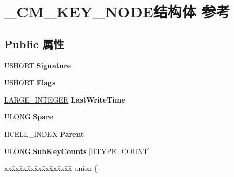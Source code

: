 \hypertarget{struct___c_m___k_e_y___n_o_d_e}{}\section{\+\_\+\+C\+M\+\_\+\+K\+E\+Y\+\_\+\+N\+O\+D\+E结构体 参考}
\label{struct___c_m___k_e_y___n_o_d_e}
\subsection*{Public 属性}
\begin{DoxyCompactItemize}
\item 
\mbox{\label{struct___c_m___k_e_y___n_o_d_e_a0b27a0e35ab86cf9c5e9e7870a9a9147}} 
U\+S\+H\+O\+RT {\bfseries Signature}
\item 
\mbox{\label{struct___c_m___k_e_y___n_o_d_e_abb8617b0d69c5f9a42ac4967d5c47191}} 
U\+S\+H\+O\+RT {\bfseries Flags}
\item 
\mbox{\label{struct___c_m___k_e_y___n_o_d_e_affc8613a1ae564872faed1334b35c6ed}} 
\hyperlink{union___l_a_r_g_e___i_n_t_e_g_e_r}{L\+A\+R\+G\+E\+\_\+\+I\+N\+T\+E\+G\+ER} {\bfseries Last\+Write\+Time}
\item 
\mbox{\label{struct___c_m___k_e_y___n_o_d_e_a0e5019022136fbdf24aea7b2d2482a4c}} 
U\+L\+O\+NG {\bfseries Spare}
\item 
\mbox{\label{struct___c_m___k_e_y___n_o_d_e_a45b5303f608bac756bbbf70e73a9bc0d}} 
H\+C\+E\+L\+L\+\_\+\+I\+N\+D\+EX {\bfseries Parent}
\item 
\mbox{\label{struct___c_m___k_e_y___n_o_d_e_a95a05866650930deba2883a6415ae790}} 
U\+L\+O\+NG {\bfseries Sub\+Key\+Counts} \mbox{[}H\+T\+Y\+P\+E\+\_\+\+C\+O\+U\+NT\mbox{]}
\item 
\mbox{\label{struct___c_m___k_e_y___n_o_d_e_a69f6686a192a1127550f291a6e6e5975}} 
\begin{tabbing}
xx\=xx\=xx\=xx\=xx\=xx\=xx\=xx\=xx\=\kill
union \{\\

\end{tabbing}
\end{DoxyCompactItemize}
